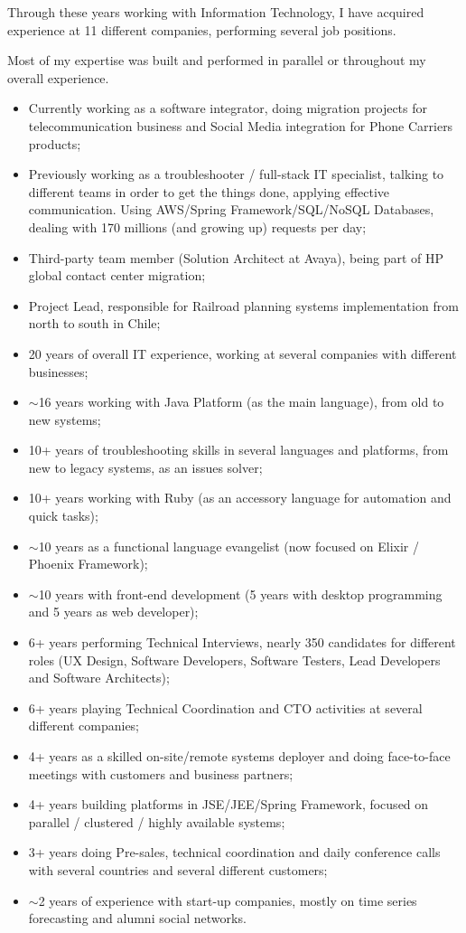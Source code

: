 
\begin{cvparagraph}
Through these years working with Information Technology, I have acquired experience at 11 different companies, performing several job positions.

Most of my expertise was built and performed in parallel or throughout my overall experience.

\begin{itemize}
\item Currently working as a software integrator, doing migration projects for telecommunication business and Social Media integration for Phone Carriers products;
\item Previously working as a troubleshooter / full-stack IT specialist, talking to different teams in order to get the things done, applying effective communication. Using AWS/Spring Framework/SQL/NoSQL Databases, dealing with 170 millions (and growing up) requests per day;
\item Third-party team member (Solution Architect at Avaya), being part of HP global contact center migration;
\item Project Lead, responsible for Railroad planning systems implementation from north to south in Chile;
\item 20 years of overall IT experience, working at several companies with different businesses;
\item $\sim$16 years working with Java Platform (as the main language), from old to new systems;
\item 10+ years of troubleshooting skills in several languages and platforms, from new to legacy systems, as an issues solver;
\item 10+ years working with Ruby  (as an accessory language for automation and quick tasks);
\item $\sim$10 years as a functional language evangelist (now focused on Elixir / Phoenix Framework);
\item $\sim$10 years with front-end development (5 years with desktop programming and 5 years as web developer);
\item 6+ years performing Technical Interviews, nearly 350 candidates for different roles (UX Design, Software Developers, Software Testers, Lead Developers and Software Architects);
\item 6+ years playing Technical Coordination and CTO activities at several different companies;
\item 4+ years as a skilled on-site/remote systems deployer and doing face-to-face meetings with customers and business partners;
\item 4+ years building platforms in JSE/JEE/Spring Framework, focused on parallel / clustered / highly available systems;
\item 3+ years doing Pre-sales, technical coordination and daily conference calls with several countries and several different customers;
\item $\sim$2 years of experience with start-up companies, mostly on time series forecasting and alumni social networks.
\end{itemize}
\end{cvparagraph}
